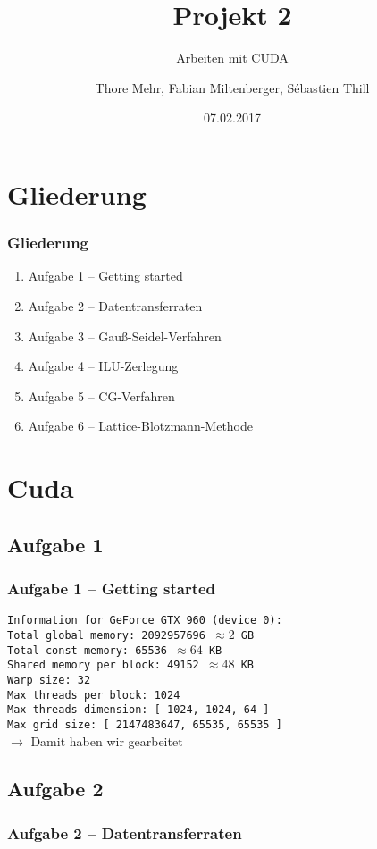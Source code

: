 \documentclass[german,notes,18pt]{beamer}
\title{Projekt 2}
\subtitle{Arbeiten mit CUDA}
\author{Thore Mehr, Fabian Miltenberger, Sébastien Thill}
\date{07.02.2017}
\institute{Lehrstuhl für Rechnerarchitektur und Parallelverarbeitung (ITEC)}
\begin{document}
	
	\frame{\titlepage}
	
	\section{Gliederung}
	\begin{frame}
		\frametitle{Gliederung}
		
		\begin{enumerate}
			\item Aufgabe 1 -- Getting started
			\item Aufgabe 2 -- Datentransferraten
			\item Aufgabe 3 -- Gauß-Seidel-Verfahren
			\item Aufgabe 4 -- ILU-Zerlegung
			\item Aufgabe 5 -- CG-Verfahren
			\item Aufgabe 6 -- Lattice-Blotzmann-Methode
		\end{enumerate}
	\end{frame}

	\section{Cuda}
	\subsection{Aufgabe 1}
	\begin{frame}
		\frametitle{Aufgabe 1 -- Getting started}
		
		\texttt{Information for GeForce GTX 960 (device 0): \\
		Total global  memory: 2092957696 $\approx2$ GB \\
		Total const memory: 65536 $\approx64$ KB \\
		Shared memory per block: 49152 $\approx48$ KB \\
		Warp size: 32 \\
		Max threads per block: 1024 \\
		Max threads dimension: [ 1024, 1024, 64 ] \\
		Max grid size: [ 2147483647, 65535, 65535 ]} \\
		\vspace{2em}
		$\rightarrow$ Damit haben wir gearbeitet
	\end{frame}

	\subsection{Aufgabe 2}
	\begin{frame}
		\frametitle{Aufgabe 2 -- Datentransferraten}
		
	\end{frame}
\end{document}
